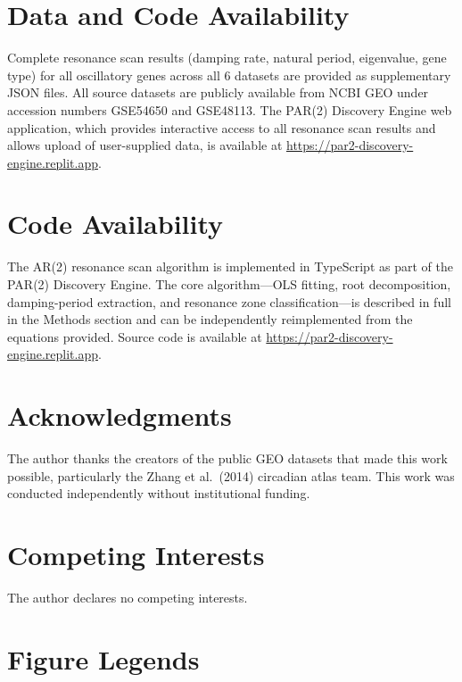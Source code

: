 \documentclass[11pt,letterpaper]{article}
\begin{document}
\section{Data and Code Availability}

Complete resonance scan results (damping rate, natural period, eigenvalue, gene type) for all oscillatory genes across all 6 datasets are provided as supplementary JSON files. All source datasets are publicly available from NCBI GEO \citep{barrett2013ncbi} under accession numbers GSE54650 \citep{zhang2014circadian} and GSE48113. The PAR(2) Discovery Engine web application, which provides interactive access to all resonance scan results and allows upload of user-supplied data, is available at \url{https://par2-discovery-engine.replit.app}.

\section{Code Availability}

The AR(2) resonance scan algorithm is implemented in TypeScript as part of the PAR(2) Discovery Engine. The core algorithm---OLS fitting, root decomposition, damping-period extraction, and resonance zone classification---is described in full in the Methods section and can be independently reimplemented from the equations provided. Source code is available at \url{https://par2-discovery-engine.replit.app}.

\section*{Acknowledgments}

The author thanks the creators of the public GEO datasets that made this work possible, particularly the Zhang et al.\ (2014) circadian atlas team. This work was conducted independently without institutional funding.

\section*{Competing Interests}

The author declares no competing interests.

\section{Figure Legends}
\end{document}
